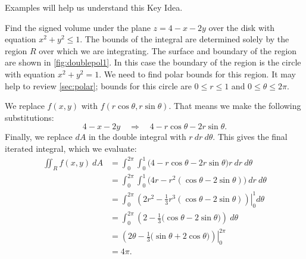 
Examples will help us understand this Key Idea.

\begin{example}\label{ex_doublepol1}
Find the signed volume under the plane $z=4-x-2y$ over the disk with equation $x^2+y^2\le1$.
\solution
{}%
%
The bounds of the integral are determined solely by the region $R$ over which we are integrating. The surface and boundary of the region are shown in \autoref{fig:doublepol1}. In this case the boundary of the region is the circle with equation $x^2+y^2=1$. We need to find polar bounds for this region. It may help to review \autoref{sec:polar}; bounds for this circle are $0\leq r\leq 1$ and $0\leq \theta\leq 2\pi$.

We replace $f(x,y)$ with $f(r\cos\theta,r\sin\theta)$. That means we make the following substitutions:
\[4-x-2y \quad \Rightarrow \quad 4-r\cos\theta-2r\sin\theta.\]
Finally, we replace $dA$ in the double integral with $r\ dr\ d\theta$. This gives the final iterated integral, which we evaluate:
\begin{align*}
\iint_Rf(x,y)\ dA
 &= \int_0^{2\pi}\int_0^1\bigl(4-r\cos\theta-2r\sin\theta\bigr)r\ dr\ d\theta\\
 &= \int_0^{2\pi}\int_0^1\bigl(4r-r^2(\cos\theta-2\sin\theta)\bigr)\ dr\ d\theta\\
 &= \int_0^{2\pi}\left.\left(2r^2-\frac13r^3(\cos\theta-2\sin\theta)\right)\right|_0^1d\theta\\
 &= \int_0^{2\pi} \left(2-\frac13\bigl(\cos\theta-2\sin\theta\bigr)\right)\ d\theta\\
 &= \left.\left(2\theta -\frac13\bigl(\sin\theta+2\cos\theta\bigr)\right)\right|_0^{2\pi} \\
 &= 4\pi %
 .
\end{align*}
\end{example}

